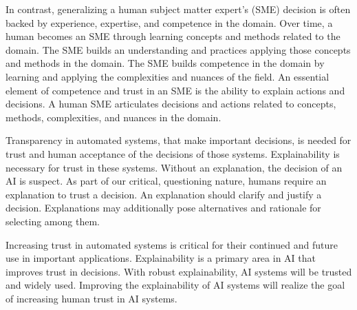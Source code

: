 In contrast, generalizing a human subject matter expert's (SME) decision is
often backed by experience, expertise, and competence in the domain. Over time,
a human becomes an SME through learning concepts and methods related to the
domain. The SME builds an understanding and practices applying those concepts
and methods in the domain. The SME builds competence in the domain by learning
and applying the complexities and nuances of the field. An essential element of
competence and trust in an SME is the ability to explain actions and decisions.
A human SME articulates decisions and actions related to concepts, methods,
complexities, and nuances in the domain\cite{hardovs2018exactly}.

Transparency in automated systems, that make important decisions, is needed for
trust and human acceptance of the decisions of those systems. Explainability is
necessary for trust in these systems. Without an explanation, the decision of an
AI is suspect. As part of our critical, questioning nature, humans require an
explanation to trust a decision. An explanation should clarify and justify a
decision. Explanations may additionally pose alternatives and rationale for
selecting among them\cite{2019_EU_ethics_gl_trustworthy_ai}.

Increasing trust in automated systems is critical for their continued and future
use in important applications. Explainability is a primary area in AI that
improves trust in decisions. With robust explainability, AI systems will be
trusted and widely used. Improving the explainability of AI systems will realize
the goal of increasing human trust in AI systems.







